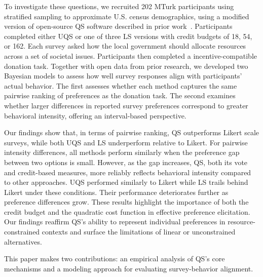 
To investigate these questions, we recruited 202 MTurk participants using stratified sampling to approximate U.S. census demographics, using a modified version of open-source QS software described in prior work~\cite{chengCanShowWhat2021}. Participants completed either UQS or one of three LS versions with credit budgets of 18, 54, or 162. Each survey asked how the local government should allocate resources across a set of societal issues. Participants then completed a incentive-compatible donation task. Together with open data from prior research, we developed two Bayesian models to assess how well survey responses align with participants' actual behavior. The first assesses whether each method captures the same pairwise ranking of preferences as the donation task. The second examines whether larger differences in reported survey preferences correspond to greater behavioral intensity, offering an interval-based perspective.

Our findings show that, in terms of pairwise ranking, QS outperforms Likert scale surveys, while both UQS and LS underperform relative to Likert. For pairwise intensity differences, all methods perform similarly when the preference gap between two options is small. However, as the gap increases, QS, both its vote and credit-based measures, more reliably reflects behavioral intensity compared to other approaches. UQS performed similarly to Likert while LS trails behind Likert under these conditions. Their performance deteriorates further as preference differences grow. These results highlight the importance of both the credit budget and the quadratic cost function in effective preference elicitation. Our findings reaffirm QS's ability to represent individual preferences in resource-constrained contexts and surface the limitations of linear or unconstrained alternatives.


This paper makes two contributions: an empirical analysis of QS's core mechanisms and a modeling approach for evaluating survey-behavior alignment.

